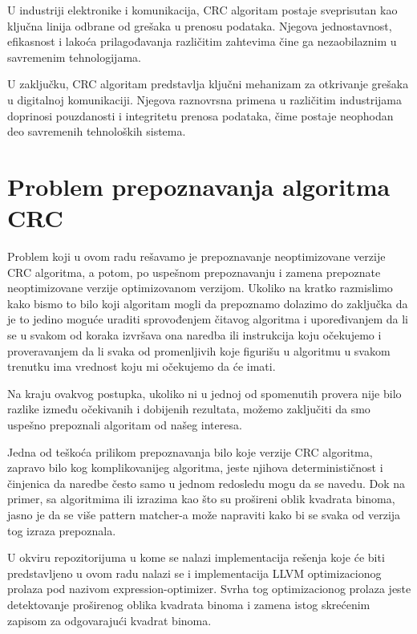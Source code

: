 \documentclass[12pt,oneside]{memoir}
\begin{document}
U industriji elektronike i komunikacija, CRC algoritam postaje sveprisutan kao 
ključna linija odbrane od grešaka u prenosu podataka. Njegova jednostavnost, 
efikasnost i lakoća prilagođavanja različitim zahtevima čine ga nezaobilaznim u 
savremenim tehnologijama.

U zaključku, CRC algoritam predstavlja ključni mehanizam za otkrivanje grešaka 
u digitalnoj komunikaciji. Njegova raznovrsna primena u različitim industrijama 
doprinosi pouzdanosti i integritetu prenosa podataka, čime postaje neophodan 
deo savremenih tehnoloških sistema.

\section{Problem prepoznavanja algoritma CRC}
Problem koji u ovom radu rešavamo je prepoznavanje 
neoptimizovane verzije CRC algoritma, a potom, po uspešnom prepoznavanju i 
zamena prepoznate neoptimizovane verzije optimizovanom verzijom.
Ukoliko na kratko razmislimo kako bismo to bilo koji algoritam mogli da 
prepoznamo dolazimo do zaključka da je to jedino moguće uraditi sprovođenjem 
čitavog algoritma i upoređivanjem da li se u svakom od koraka izvršava ona 
naredba ili instrukcija koju očekujemo i proveravanjem da li svaka od 
promenljivih koje figurišu u algoritmu u svakom trenutku ima vrednost koju mi 
očekujemo da će imati.

Na kraju ovakvog postupka, ukoliko ni u jednoj od spomenutih provera nije bilo 
razlike između očekivanih i dobijenih rezultata, možemo zaključiti da 
smo uspešno prepoznali algoritam od našeg interesa.

Jedna od teškoća prilikom prepoznavanja bilo koje verzije CRC algoritma, 
zapravo bilo kog komplikovanijeg algoritma, jeste njihova determinističnost i 
činjenica da naredbe često samo u jednom redosledu mogu da se navedu. Dok na 
primer, sa algoritmima ili izrazima kao što su prošireni oblik kvadrata binoma, 
jasno je da se više pattern matcher-a može napraviti kako bi se svaka od 
verzija tog izraza prepoznala.

U okviru repozitorijuma u kome se nalazi implementacija rešenja koje će biti predstavljeno u ovom radu nalazi se i implementacija LLVM optimizacionog prolaza pod nazivom expression-optimizer. Svrha tog optimizacionog prolaza jeste detektovanje proširenog oblika kvadrata binoma i zamena istog skrećenim zapisom za odgovarajući kvadrat binoma. 
\end{document}

